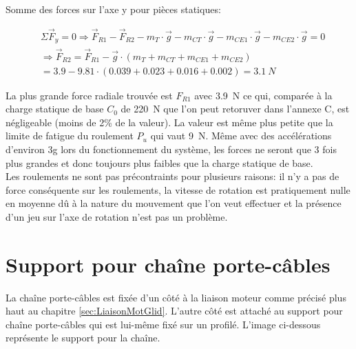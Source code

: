Somme des forces sur l'axe y pour pièces statiques:

\begin{equation}
    \begin{aligned}
         & \Sigma \vec{F}_y = 0 \Rightarrow \vec{F}_{R1} - \vec{F}_{R2} - m_T \cdot \vec{g} - m_{CT} \cdot \vec{g} - m_{CE1} \cdot \vec{g} - m_{CE2} \cdot \vec{g} = 0 \\
         & \Rightarrow \vec{F}_{R2} = \vec{F}_{R1} - \vec{g} \cdot (m_T + m_{CT} + m_{CE1} + m_{CE2})                                                                  \\
         & = 3.9 - 9.81 \cdot (0.039 + 0.023 + 0.016 +0.002) = 3.1~N
    \end{aligned}
\end{equation}

La plus grande force radiale trouvée est $F_{R1}$ avec 3.9~N ce qui, comparée à la charge statique de base $C_0$ de 220~N que l'on peut retoruver dans
l'annexe C, est négligeable (moins de 2\% de la valeur). La valeur est même plus petite que la limite de fatigue du roulement $P_u$ qui vaut 9~N.
Même avec des accélérations d'environ 3g lors du fonctionnement du système, les forces ne seront que 3 fois plus grandes et donc toujours
plus faibles que la charge statique de base.\\

Les roulements ne sont pas précontraints pour plusieurs raisons: il n'y a pas de force conséquente sur les roulements, la vitesse de rotation
est pratiquement nulle en moyenne dû à la nature du mouvement que l'on veut effectuer et la présence d'un jeu sur l'axe de rotation n'est pas
un problème.

\section{Support pour chaîne porte-câbles}\label{sec:SupChainCable}
La chaîne porte-câbles est fixée d'un côté à la liaison moteur comme précisé plus haut au chapitre \ref{sec:LiaisonMotGlid}. L'autre côté est
attaché au support pour chaîne porte-câbles qui est lui-même fixé sur un profilé. L'image ci-dessous représente le support pour la chaîne.

